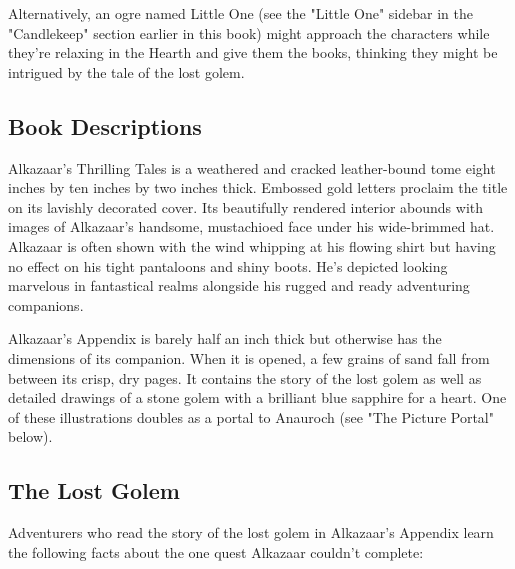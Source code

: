 \documentclass[10pt,a4paper,twoside,bg=print,twocolumn,openany,nodeprecatedcode]{dndbook}
\begin{document}
Alternatively, an ogre named Little One (see the "Little One" sidebar in the "Candlekeep" section earlier in this book) might approach the characters while they're relaxing in the Hearth and give them the books, thinking they might be intrigued by the tale of the lost golem.

\subsection{Book Descriptions}
Alkazaar's Thrilling Tales is a weathered and cracked leather-bound tome eight inches by ten inches by two inches thick. Embossed gold letters proclaim the title on its lavishly decorated cover. Its beautifully rendered interior abounds with images of Alkazaar's handsome, mustachioed face under his wide-brimmed hat. Alkazaar is often shown with the wind whipping at his flowing shirt but having no effect on his tight pantaloons and shiny boots. He's depicted looking marvelous in fantastical realms alongside his rugged and ready adventuring companions.

Alkazaar's Appendix is barely half an inch thick but otherwise has the dimensions of its companion. When it is opened, a few grains of sand fall from between its crisp, dry pages. It contains the story of the lost golem as well as detailed drawings of a stone golem with a brilliant blue sapphire for a heart. One of these illustrations doubles as a portal to Anauroch (see "The Picture Portal" below).

\subsection{The Lost Golem}
Adventurers who read the story of the lost golem in Alkazaar's Appendix learn the following facts about the one quest Alkazaar couldn't complete:
\end{document}
